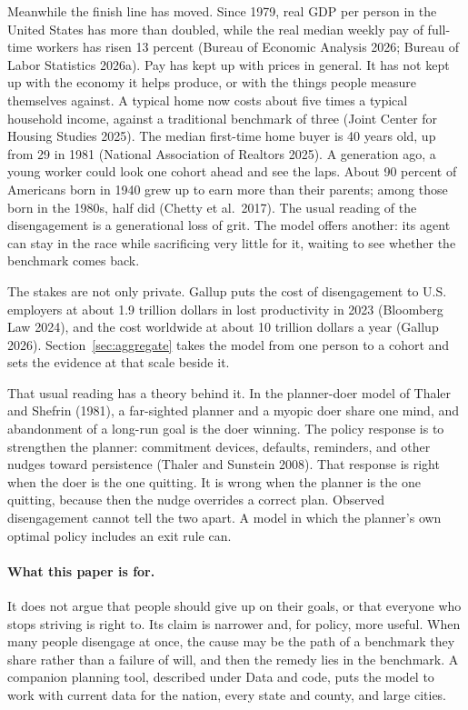\documentclass[12pt]{article}
\theoremstyle{definition}
\theoremstyle{remark}
\theoremstyle{plain}
\theoremstyle{definition}
\begin{document}
Meanwhile the finish line has moved. Since 1979, real GDP per person in the United States has more than doubled, while the real median weekly pay of full-time workers has risen 13 percent (Bureau of Economic Analysis 2026; Bureau of Labor Statistics 2026a). Pay has kept up with prices in general. It has not kept up with the economy it helps produce, or with the things people measure themselves against. A typical home now costs about five times a typical household income, against a traditional benchmark of three (Joint Center for Housing Studies 2025). The median first-time home buyer is 40 years old, up from 29 in 1981 (National Association of Realtors 2025). A generation ago, a young worker could look one cohort ahead and see the laps. About 90 percent of Americans born in 1940 grew up to earn more than their parents; among those born in the 1980s, half did (Chetty et al.\ 2017). The usual reading of the disengagement is a generational loss of grit. The model offers another: its agent can stay in the race while sacrificing very little for it, waiting to see whether the benchmark comes back.

The stakes are not only private. Gallup puts the cost of disengagement to U.S. employers at about 1.9 trillion dollars in lost productivity in 2023 (Bloomberg Law 2024), and the cost worldwide at about 10 trillion dollars a year (Gallup 2026). Section~\ref{sec:aggregate} takes the model from one person to a cohort and sets the evidence at that scale beside it.

That usual reading has a theory behind it. In the planner-doer model of Thaler and Shefrin (1981), a far-sighted planner and a myopic doer share one mind, and abandonment of a long-run goal is the doer winning. The policy response is to strengthen the planner: commitment devices, defaults, reminders, and other nudges toward persistence (Thaler and Sunstein 2008). That response is right when the doer is the one quitting. It is wrong when the planner is the one quitting, because then the nudge overrides a correct plan. Observed disengagement cannot tell the two apart. A model in which the planner's own optimal policy includes an exit rule can.

\paragraph{What this paper is for.} It does not argue that people should give up on their goals, or that everyone who stops striving is right to. Its claim is narrower and, for policy, more useful. When many people disengage at once, the cause may be the path of a benchmark they share rather than a failure of will, and then the remedy lies in the benchmark. A companion planning tool, described under Data and code, puts the model to work with current data for the nation, every state and county, and large cities.
\end{document}
